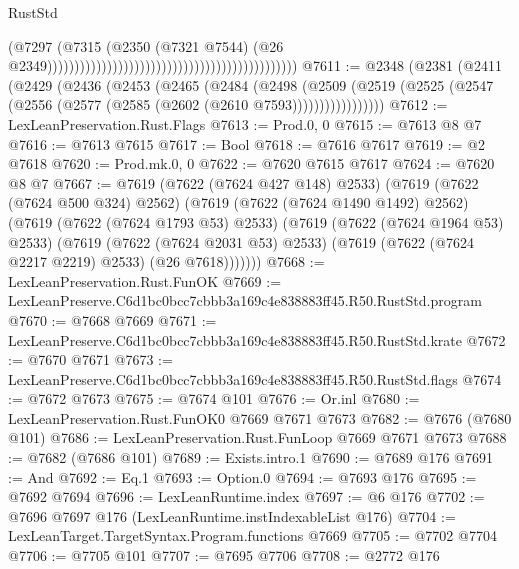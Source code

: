 \begin{lexlean}{RustStd}
\begin{coremodule}
                                                                                        (@7297
                                                                                          (@7315
                                                                                            (@2350
                                                                                              (@7321
                                                                                                @7544)
                                                                                              (@26
                                                                                                @2349))))))))))))))))))))))))))))))))))))))))))))))
@7611 := @2348
    (@2381
      (@2411
        (@2429
          (@2436
            (@2453
              (@2465
                (@2484
                  (@2498
                    (@2509
                      (@2519 (@2525 (@2547 (@2556 (@2577 (@2585 (@2602 (@2610 @7593)))))))))))))))))
@7612 := LexLeanPreservation.Rust.Flags
@7613 := Prod.{0, 0}
@7615 := @7613 @8 @7
@7616 := @7613 @7615
@7617 := Bool
@7618 := @7616 @7617
@7619 := @2 @7618
@7620 := Prod.mk.{0, 0}
@7622 := @7620 @7615 @7617
@7624 := @7620 @8 @7
@7667 := @7619
    (@7622 (@7624 @427 @148) @2533)
    (@7619
      (@7622 (@7624 @500 @324) @2562)
      (@7619
        (@7622 (@7624 @1490 @1492) @2562)
        (@7619
          (@7622 (@7624 @1793 @53) @2533)
          (@7619
            (@7622 (@7624 @1964 @53) @2533)
            (@7619
              (@7622 (@7624 @2031 @53) @2533)
              (@7619 (@7622 (@7624 @2217 @2219) @2533) (@26 @7618)))))))
@7668 := LexLeanPreservation.Rust.FunOK
@7669 := LexLeanPreserve.C6d1bc0bcc7cbbb3a169c4e838883ff45.R50.RustStd.program
@7670 := @7668 @7669
@7671 := LexLeanPreserve.C6d1bc0bcc7cbbb3a169c4e838883ff45.R50.RustStd.krate
@7672 := @7670 @7671
@7673 := LexLeanPreserve.C6d1bc0bcc7cbbb3a169c4e838883ff45.R50.RustStd.flags
@7674 := @7672 @7673
@7675 := @7674 @101
@7676 := Or.inl
@7680 := LexLeanPreservation.Rust.FunOK0 @7669 @7671 @7673
@7682 := @7676 (@7680 @101)
@7686 := LexLeanPreservation.Rust.FunLoop @7669 @7671 @7673
@7688 := @7682 (@7686 @101)
@7689 := Exists.intro.{1}
@7690 := @7689 @176
@7691 := And
@7692 := Eq.{1}
@7693 := Option.{0}
@7694 := @7693 @176
@7695 := @7692 @7694
@7696 := LexLeanRuntime.index
@7697 := @6 @176
@7702 := @7696 @7697 @176 (LexLeanRuntime.instIndexableList @176)
@7704 := LexLeanTarget.TargetSyntax.Program.functions @7669
@7705 := @7702 @7704
@7706 := @7705 @101
@7707 := @7695 @7706
@7708 := @2772 @176

\end{coremodule}
\end{lexlean}
